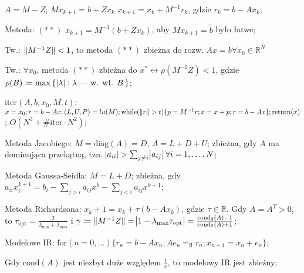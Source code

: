 
\entry
$A=M-Z$;
\entry
$Mx_{k+1}=b+Zx_{k}$
\entry
$x_{k+1}=x_k+M^{-1}r_k$, gdzie $r_k=b-Ax_k$;

\entry
Metoda: $\mathrm{(**)}$ $x_{k+1}=M^{-1}(b+Zx_k)$,
aby $Mx_{k+1}=\tilde{b}$ było łatwe;

\entry
Tw.: $\|M^{-1}Z\| < 1$,
to metoda $\mathrm{(**)}$ zbieżna do rozw. $Ax=b \forall x_0 \in \mathbb{R}^N$

\entry
Tw.: $\forall x_0$,
metoda $\mathrm{(**)}$
zbieżna do $x^* \leftrightarrow \rho(M^{-1}Z) < 1$,
gdzie $\rho(B) \coloneqq \max\set{\abs{\lambda} : \lambda\text{ --- w. wł. } B}$;

\entry
$\mathrm{iter}(A,b,x_0,M,t)$:
$x=x_0;
r=b - Ax;
(L,U,P) = lu(M);
\mathrm{while}(\|r\| > t) \{
    p = M^{-1}r;
    x=x+p;
    r=b-Ax
\};
\mathrm{return}(x)
$;
$O(N^3 + \mathrm{\#iter} \cdot N^2)$;

\entry
Metoda Jacobiego:
$M=\mathrm{diag}(A) = D$, $A=L+D+U$;
zbieżna, gdy $A$ ma dominująca przekątną,
tzn. $\abs{a_{ii}} > \sum_{j\neq i}\abs{a_{ij}} \forall i=1, \ldots, N$;

\entry
Metoda Gaussa-Seidla:
$M = L + D$;
zbieżna, gdy $a_{ii}x_i^{k+1}=b_i-\sum_{j>i}a_{ij}x^k-\sum_{j<i}a_{ij}x^{k+1}$;

\entry
Metoda Richardsona:
$x_k+1 = x_k + \tau(b-Ax_k)$, gdzie $\tau\in\mathbb{R}$.
Gdy $A=A^T>0$,
to $\tau_{\mathrm{opt}}=\frac{2}{\lambda_{\mathrm{min}} + \lambda_{\mathrm{max}} }$
i $\gamma \coloneqq \|M^{-1}Z\|=\abs{1-\lambda_{\mathrm{max}}\tau_{\mathrm{opt}}}=\frac{\mathrm{cond}_2(A)-1}{\mathrm{cond}_2(A) + 1}$;

\entry
Modelowe IR:
$\mathrm{for}(n=0,\ldots)\{ r_n=b-Ax_n; Ae_n=_{\mathrm{fl}}r_n; x_{n+1} = x_n + e_n \}$;


\entry
Gdy $\mathrm{cond}(A)$ jest niezbyt duże względem $\frac{1}{\nu}$, to modelowy IR jest zbieżny;


